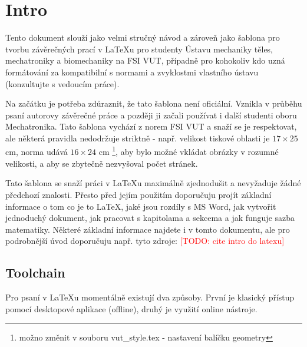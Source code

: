 \chapter{Intro}
\label{chap:intro}
Tento dokument slouží jako velmi stručný návod a zároveň jako šablona pro tvorbu závěrečných prací v LaTeXu pro studenty Ústavu mechaniky těles, mechatroniky a biomechaniky na FSI VUT, případně pro kohokoliv kdo uzná formátování za kompatibilní s normami a zvyklostmi vlastního ústavu (konzultujte s vedoucím práce).

Na začátku je potřeba zdůraznit, že tato šablona není oficiální. Vznikla v průběhu psaní autorovy závěrečné práce a později ji začali používat i další studenti oboru Mechatronika. Tato šablona vychází z norem FSI VUT a snaží se je respektovat, ale některá pravidla nedodržuje striktně - např. velikost tiskové oblasti je $17\times25$ cm, norma udává $16\times24$ cm \footnote{možno změnit v souboru vut\_style.tex - nastavení balíčku geometry}, aby bylo možné vkládat obrázky v rozumné velikosti, a aby se zbytečně nezvyšoval počet stránek.

Tato šablona se snaží práci v LaTeXu maximálně zjednodušit a nevyžaduje žádné předchozí znalosti. Přesto před jejím použitím doporučuju projít základní informace o tom co je to LaTeX, jaké jsou rozdíly s MS Word, jak vytvořit jednoduchý dokument, jak pracovat s kapitolama a sekcema a jak funguje sazba matematiky. Některé základní informace najdete i v tomto dokumentu, ale pro podrobnější úvod doporučuju např. tyto zdroje: \textcolor{red}{[TODO: cite intro do latexu]} 
%

\section{Toolchain}
\label{sec:Toolchain}
Pro psaní v LaTeXu momentálně existují dva způsoby.  První je klasický přístup pomocí desktopové aplikace (offline), druhý je využití online nástroje.

